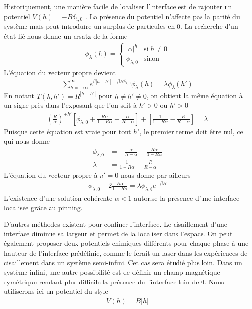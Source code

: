 Historiquement, une manière facile de localiser l'interface est de rajouter un potentiel $V(h) = -B \delta_{h,0}$ \cite{chui}. La présence du potentiel n'affecte pas la parité du système mais peut introduire un surplus de particules en $0$. La recherche d'un état lié nous donne un ersatz de la forme 
\begin{align}
	\phi_\lambda(h) = \begin{cases} |\alpha|^h & \text{si } h \neq 0 \\ \phi_{\lambda,0} & \text{sinon} \end{cases} 
\end{align}
L'équation du vecteur propre devient
\begin{align}
	\sum_{h=-\infty}^\infty e^{\beta |h-h'|- \beta B \delta_{h,0}} \phi_\lambda(h) = \lambda \phi_\lambda(h')
\end{align}
En notant $T(h,h') = R^{|h-h'|}$ pour $h \neq h' \neq 0$,  on obtient la même équation à un signe près dans l'exposant que l'on soit à $h'>0$ ou $h'>0$
\begin{align}
	\left( \frac{R}{\alpha} \right)^{\pm h'} \left[ \phi_{\lambda,0} + \frac{R \alpha}{1 - R \alpha} + \frac{\alpha}{R - \alpha} \right] + \left[ \frac{1}{1-R \alpha} - \frac{R}{R-\alpha} \right] = \lambda
\end{align}
Puisque cette équation est vraie pour tout $h'$, le premier terme doit être nul, ce qui nous donne
\begin{align}
	\phi_{\lambda,0} &= - \frac{\alpha}{R-\alpha}-\frac{R \alpha}{1-R \alpha} \\
	\lambda &= \frac{1}{1-R \alpha} - \frac{R}{R-\alpha}
\end{align}
L'équation du vecteur propre à $h'=0$ nous donne par ailleurs 
\begin{align}
	\phi_{\lambda,0} + 2 \frac{R \alpha}{1-R \alpha} = \lambda \phi_{\lambda,0} e^{-\beta B}
\end{align}
L'existence d'une solution cohérente $\alpha < 1$ autorise la présence d'une interface localisée grâce au pinning.

D'autres méthodes existent pour confiner l'interface. Le cisaillement d'une interface diminue sa largeur et permet de la localiser dans l'espace. On peut également proposer deux potentiels chimiques différents pour chaque phase à une hauteur de l'interface prédéfinie, comme le ferait un laser dans les expériences de cisaillement\cite{delville} dans un système semi-infini. Cet cas sera étudié plus loin. Dans un système infini, une autre possibilité est de définir un champ magnétique symétrique rendant plus difficile la présence de l'interface loin de $0$. Nous utiliserons ici un potentiel du style
\begin{align}
		  V(h) = B |h|
\end{align}

